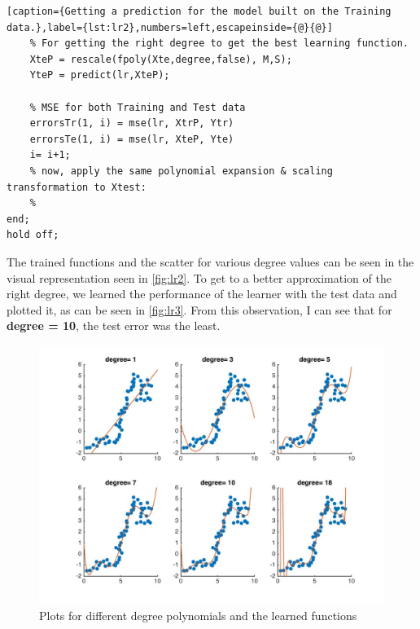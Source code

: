 \documentclass[a4paper, 11pt]{article}
\begin{document}
\begin{enumerate}[(a)]
\begin{lstlisting}[caption={Getting a prediction for the model built on the Training data.},label={lst:lr2},numbers=left,escapeinside={@}{@}]
    % For getting the right degree to get the best learning function.
    XteP = rescale(fpoly(Xte,degree,false), M,S);
    YteP = predict(lr,XteP);
    
    % MSE for both Training and Test data
    errorsTr(1, i) = mse(lr, XtrP, Ytr)
    errorsTe(1, i) = mse(lr, XteP, Yte)
    i= i+1;
    % now, apply the same polynomial expansion & scaling transformation to Xtest:
    % 
end;
hold off;
\end{lstlisting}

The trained functions and the scatter for various degree values can be seen in the visual representation seen in \autoref{fig:lr2}. To get to a better approximation of the right degree, we learned the performance of the learner with the test data and plotted it, as can be seen in \autoref{fig:lr3}. From this observation, I can see that for \textbf{degree = 10}, the test error was the least.
\begin{figure}
\centering
\includegraphics[scale=0.25]{lr1.jpg}
\caption[lr2]{Plots for different degree polynomials and the learned functions}
\label{fig:lr2}
\end{figure}


\end{enumerate}
\end{document}
